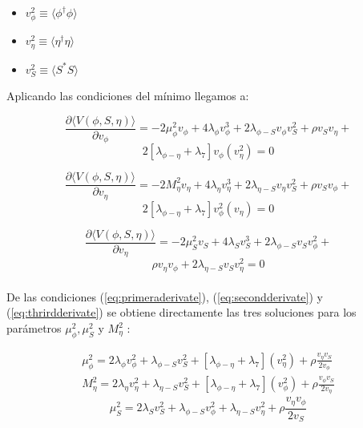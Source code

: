 \documentclass[12pt]{article}
\begin{document}
\begin{itemize}
    \item $v^{2}_\phi \equiv \langle \phi^\dagger\phi \rangle$
    \item $v^{2}_\eta \equiv \langle \eta^\dagger\eta \rangle$
    \item $v^{2}_S \equiv \langle S^* S \rangle$

\end{itemize}

Aplicando las condiciones del mínimo llegamos a: 

\begin{equation}
\label{eq:primeraderivate}
    \frac{\partial{\langle V(\phi, S, \eta) }\rangle }{\partial v_\phi} =  -2\mu^{2}_\phi v_\phi + 4\lambda_\phi v^{3}_\phi + 2 \lambda_{\phi-S}v_\phi v_S^{2} +  \rho v_S v_\eta +
\end{equation}
 \[ 2[\lambda_{\phi-\eta}+\lambda_7]v_\phi(v_\eta^2)  =0 \] 
 
 
 \begin{equation}
    \frac{\partial{\langle V(\phi, S, \eta) }\rangle }{\partial v_\eta} =  -2M^{2}_\eta v_\eta + 4\lambda_\eta v^{3}_\eta + 2 \lambda_{\eta-S}v_\eta v_S^{2} +  \rho v_S v_\phi +
 \label{eq:secondderivate}
\end{equation}
 \[ 2[\lambda_{\phi-\eta}+\lambda_7]v_\phi^2(v_\eta)  =0 \] 
 
  \begin{equation}
    \frac{\partial{\langle V(\phi, S, \eta) }\rangle }{\partial v_\eta} =  -2\mu^{2}_S v_S + 4\lambda_S v^{3}_S + 2 \lambda_{\phi-S}v_S v_\phi^{2} +
 \label{eq:thrirdderivate}
\end{equation}
 \[   \rho v_\eta v_\phi+2\lambda_{\eta-S}v_S v_\eta^2 = 0\] \\
 
De las condiciones (\ref{eq:primeraderivate}), (\ref{eq:secondderivate}) y (\ref{eq:thrirdderivate}) se obtiene directamente las tres soluciones para los parámetros $ \mu^{2}_\phi, \mu^{2}_S $ y $M^{2}_\eta$ : 


\begin{equation}
\label{eq:eqeta}
\begin{aligned}
\mu^{2}_\phi = 2\lambda_\phi v_\phi^{2} + \lambda_{\phi-S}v_S ^{2} + [\lambda_{\phi-\eta}+\lambda_7](v_\eta^2) +  \rho \frac{v_\eta v_S }{2v_\phi} \\
M^{2}_\eta = 2\lambda_\eta v_\eta^{2} + \lambda_{\eta-S}v_S ^{2} + [\lambda_{\phi-\eta}+\lambda_7](v_\phi^2) + \rho \frac{v_\phi v_S }{2v_\eta}
\end{aligned}
\end{equation}
 \begin{equation}
  \label{eq:Mu}
      \mu^{2}_S = 2\lambda_S v_S^{2} + \lambda_{\phi-S}v_\phi ^{2} +\lambda_{\eta-S}v_\eta ^{2} + \rho \frac{v_\eta v_\phi }{2v_S}
 \end{equation} \\
\end{document}
